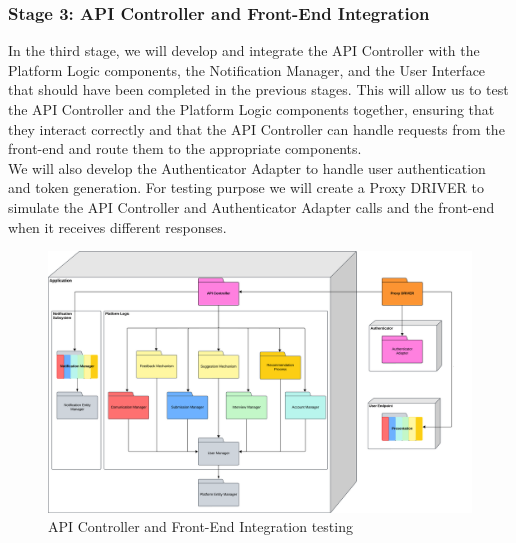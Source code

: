     \subsubsection{Stage 3: API Controller and Front-End Integration}
    In the third stage, we will develop and integrate the API Controller with the Platform Logic components, the Notification Manager, and the User Interface that should have been completed in the previous stages. This will allow us to test the API Controller and the Platform Logic components together, ensuring that they interact correctly and that the API Controller can handle requests from the front-end and route them to the appropriate components.\\
    We will also develop the Authenticator Adapter to handle user authentication and token generation. For testing purpose we will create a Proxy DRIVER to simulate the API Controller and Authenticator Adapter calls and the front-end when it receives different responses.\\ 
    \begin{figure}[H]
    \includegraphics[width=\linewidth]{Latex/Images/DD/Testing/TestingPlanStep3.png}
    \caption{API Controller and Front-End Integration testing}
    \label{fig:test-step3}
    \end{figure}
    
    \clearpage
